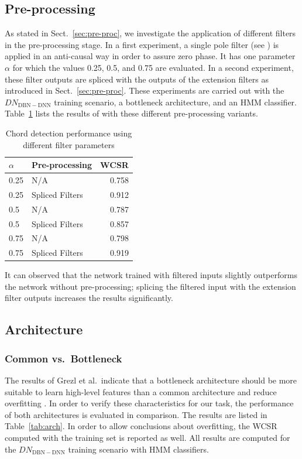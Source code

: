 \documentclass{article}
\begin{document}
\subsection{Pre-processing}
As stated in Sect.~\ref{sec:pre-proc}, we investigate the application of different filters in the pre-processing stage. 
In a first experiment, a single pole filter (see ) is applied in an anti-causal way in order to assure zero phase. It has one parameter $\alpha$ for which the values 0.25, 0.5, and 0.75 are evaluated. In a second experiment, these filter outputs are spliced with the outputs of the extension filters as introduced in Sect.~\ref{sec:pre-proc}. These experiments are carried out with the  $DN_\mathrm{DBN-DNN}$ training scenario, a bottleneck architecture, and an HMM classifier. Table~\ref{table:filter} lists the results of with these different pre-processing variants.
\begin{table}[h]
\begin{tabular*}{\columnwidth}{@{\extracolsep{\fill}}llr}
\toprule
$\alpha$    & Pre-processing  & WCSR  \\  \midrule
0.25 & N/A             & 0.758 \\
0.25 & Spliced Filters & 0.912 \\
0.5  & N/A             & 0.787 \\
0.5  & Spliced Filters & 0.857 \\
0.75 & N/A             & 0.798 \\
0.75 & Spliced Filters & 0.919 \\ \bottomrule
\end{tabular*}
\caption{Chord detection performance using different filter parameters}


\label{table:filter}

\end{table}
It can observed that the network trained with filtered inputs slightly outperforms the network without pre-processing; splicing the filtered input with the extension filter outputs increases the results significantly. 


\subsection{Architecture}
\subsubsection{Common vs.\ Bottleneck}
The results of Grezl et al.\ indicate that a bottleneck architecture should be more suitable to learn high-level features than a common architecture and reduce overfitting \cite{grezl2007probabilistic}. In order to verify these characteristics for our task, the performance of both architectures is evaluated in comparison. The results are listed in Table~\ref{tab:arch}. In order to allow conclusions about overfitting, the WCSR computed with the training set is reported as well.
All results are computed for the $DN_\mathrm{DBN-DNN}$ training scenario with HMM classifiers.
\end{document}
